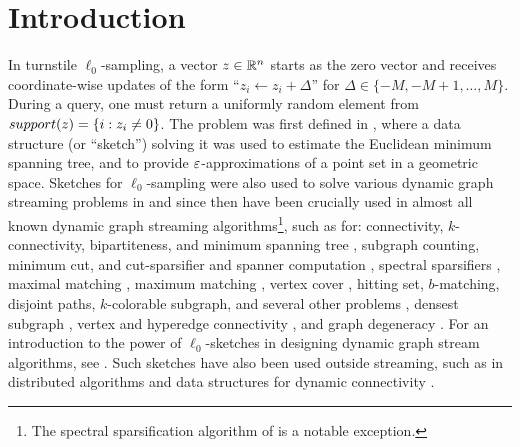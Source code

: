 \section{Introduction}\label{sec:intro}
In turnstile $\ell_0$-sampling, a vector $z\in\mathbb{R}^n$ starts as the zero vector and receives coordinate-wise updates of the form ``$z_i \leftarrow z_i + \Delta$'' for $\Delta\in\{-M,-M+1,\ldots,M\}$. During a query, one must return a uniformly random element from $\mathop{support}(z) = \{i : z_i\neq 0\}$. The problem was first defined in \cite{FrahlingIS08}, where a data structure (or ``sketch'') solving it was used to estimate the Euclidean minimum spanning tree, and to provide $\varepsilon$-approximations of a point set in a geometric space. Sketches for $\ell_0$-sampling were also used to solve various dynamic graph streaming problems in \cite{AhnGM12a} and since then have been crucially used in almost all known dynamic graph streaming algorithms\footnote{\label{specfootnote}The spectral sparsification algorithm of \cite{KapralovLMMS14} is a notable exception.}, such as for: connectivity, $k$-connectivity, bipartiteness, and minimum spanning tree \cite{AhnGM12a}, subgraph counting, minimum cut, and cut-sparsifier and spanner computation \cite{AhnGM12b}, spectral sparsifiers \cite{AhnGM13}, maximal matching \cite{ChitnisCHM15}, maximum matching \cite{AhnGM12a,BuryS15,Konrad15,AssadiKLY16,ChitnisCEHMMV16,AssadiKL17}, vertex cover \cite{ChitnisCHM15,ChitnisCEHMMV16}, hitting set, $b$-matching, disjoint paths, $k$-colorable subgraph, and several other problems \cite{ChitnisCEHMMV16}, densest subgraph \cite{BhattacharyaHNT15,McGregorTVV15,EsfandiariHW16}, vertex and hyperedge connectivity \cite{GuhaMT15}, and graph degeneracy \cite{FarachColtonT16}. For an introduction to the power of $\ell_0$-sketches in designing dynamic graph stream algorithms, see \cite[Section 3]{McGregor14}. Such sketches have also been used outside streaming, such as in distributed algorithms \cite{HegemanPPSS15,Pandurangan0S16} and data structures for dynamic connectivity \cite{KapronKM13,Wang15,GibbKKT15}.



